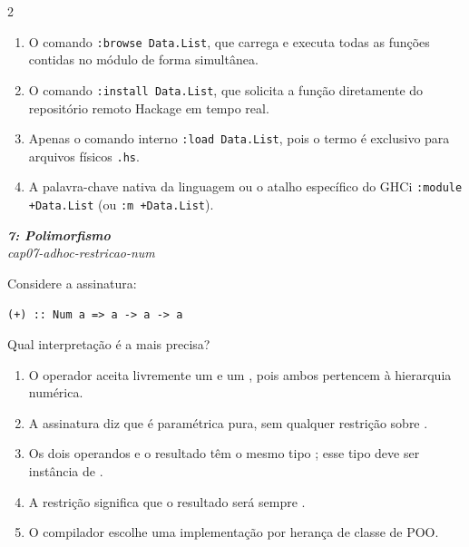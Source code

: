 \documentclass[a4paper,10pt,brazil]{article}
\begin{document}
\begin{multicols}{2}
\begin{enumerate}
  \item O comando \texttt{:browse Data.List}, que carrega e executa todas as funções contidas no módulo de forma simultânea.

  \item O comando \texttt{:install Data.List}, que solicita a função diretamente do repositório remoto Hackage em tempo real.

  \item Apenas o comando interno \texttt{:load Data.List}, pois o termo  é exclusivo para arquivos físicos \texttt{.hs}.

  \item A palavra-chave nativa da linguagem  ou o atalho específico do GHCi \texttt{:module +Data.List} (ou \texttt{:m +Data.List}).


\end{enumerate}

\begin{flushright}
  \footnotesize
  \textit{\textbf{7: Polimorfismo}}\\
  \textit{cap07-adhoc-restricao-num}\\

\end{flushright}
Considere a assinatura:

\begin{verbatim}
(+) :: Num a => a -> a -> a
\end{verbatim}

Qual interpretação é a mais precisa?

\begin{enumerate}
  \item O operador aceita livremente um  e um , pois ambos pertencem à hierarquia numérica.
  \item A assinatura diz que \haskellinline{(+)} é paramétrica pura, sem qualquer restrição sobre .
  \item Os dois operandos e o resultado têm o mesmo tipo ; esse tipo deve ser instância de .
  \item A restrição  significa que o resultado será sempre .
  \item O compilador escolhe uma implementação por herança de classe de POO.

\end{enumerate}


\end{multicols}
\end{document}

